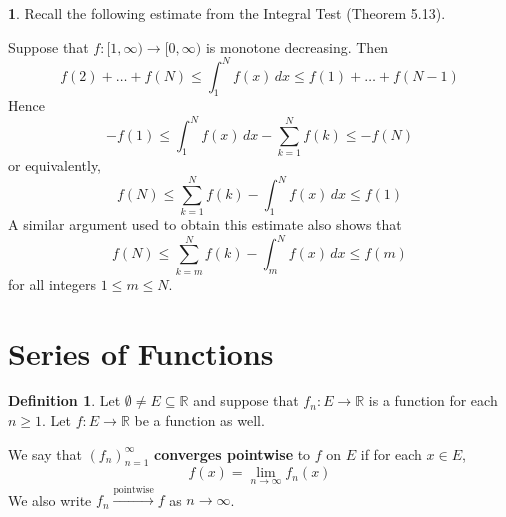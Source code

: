 \documentclass[11pt]{article}
\theoremstyle{definition}
\newtheorem{defn}[thm]{Definition}
\newtheorem{none}[thm]{}
\newcommand{\mbR}{\ensuremath{\mathbb{R}}}
\begin{document}
\begin{none}
Recall the following estimate from the Integral Test (Theorem 5.13). 

Suppose that $f : [1, \infty) \to [0, \infty)$ is monotone decreasing. Then
$$f(2) + \dots + f(N) \leq \int_1^N f(x)\,dx \leq f(1) + \dots + f(N-1)$$
Hence
$$-f(1) \leq \int_1^N f(x)\,dx - \sum_{k=1}^N f(k) \leq -f(N)$$
or equivalently,
$$f(N) \leq \sum_{k=1}^N f(k) - \int_1^N f(x)\,dx \leq f(1)$$
A similar argument used to obtain this estimate also shows that
$$f(N) \leq \sum_{k=m}^N f(k) - \int_m^N f(x)\,dx \leq f(m)$$
for all integers $1 \leq m \leq N$.
\end{none}

\newpage

\section{Series of Functions}

\begin{defn} 
Let $\emptyset \ne E \subseteq \mbR$ and suppose that $f_n : E \to \mbR$ is a function for each $n \geq 1$. Let $f : E \to \mbR$ be a function as well.

We say that $(f_n)_{n=1}^\infty$ \textbf{converges pointwise} to $f$ on $E$ if for each $x \in E$,
$$f(x) = \lim_{n\to\infty} f_n(x)$$
We also write $f_n \xrightarrow{\text{pointwise}} f$ as $n \to \infty$.
\end{defn}
\end{document}
